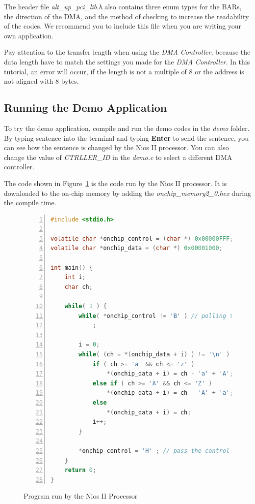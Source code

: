 \documentclass[11pt, twoside, pdftex]{article}
\begin{document}
The header file {\it alt\_up\_pci\_lib.h} also contains three enum types for the BARs, the direction of the DMA, and the method of checking to increase the readability of the codes. We recommend you to include this file when you are writing your own application. 

Pay attention to the transfer length when using the {\it DMA Controller}, because the data length have to match the settings you made for the {\it DMA Controller}. In this tutorial, an error will occur, if the length is not a multiple of 8 or the address is not aligned with 8 bytes.

\subsection{Running the Demo Application}
To try the demo application, compile and run the demo codes in the {\it demo} folder. By typing sentence into the terminal and typing {\bf Enter} to send the sentence, you can see how the sentence is changed by the Nios II processor. You can also change the value of {\it CTRLLER\_ID} in the {\it demo.c} to select a different DMA controller.

The code shown in Figure~\ref{fig:demo_nios} is the code run by the Nios II processor. It is downloaded to the on-chip memory by adding the {\it onchip\_memory2\_0.hex} during the compile time. 

\begin{figure}[H]%
\begin{lstlisting}[language=C, stepnumber=1, numbers=left]
#include <stdio.h>

volatile char *onchip_control = (char *) 0x00000FFF;
volatile char *onchip_data = (char *) 0x00001000;

int main() {
    int i;
    char ch;

    while( 1 ) {
        while( *onchip_control != 'B' ) // polling the control byte
            ;

        i = 0;
        while( (ch = *(onchip_data + i) ) != '\n' ) {
            if ( ch >= 'a' && ch <= 'z' )
                *(onchip_data + i) = ch - 'a' + 'A';
            else if ( ch >= 'A' && ch <= 'Z' )
                *(onchip_data + i) = ch - 'A' + 'a';
            else
                *(onchip_data + i) = ch;
            i++;
        }

        *onchip_control = 'H' ; // pass the control right to the host PC
    }
    return 0;
}
\end{lstlisting}
	\caption{Program run by the Nios II Processor}%
	\label{fig:demo_nios}%
\end{figure}
\end{document}

